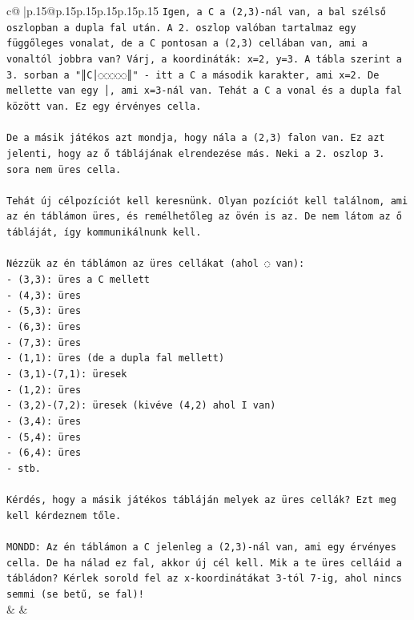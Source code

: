 \documentclass{article}
\begin{document}
{\begin{supertabular}{c@{$\;$}|p{.15\linewidth}@{}p{.15\linewidth}p{.15\linewidth}p{.15\linewidth}p{.15\linewidth}p{.15\linewidth}}
{{{\texttt{Igen, a C a (2,3){-}nál van, a bal szélső oszlopban a dupla fal után. A 2. oszlop valóban tartalmaz egy függőleges vonalat, de a C pontosan a (2,3) cellában van, ami a vonaltól jobbra van? Várj, a koordináták: x=2, y=3. A tábla szerint a 3. sorban a "║C│◌◌◌◌◌║" {-} itt a C a második karakter, ami x=2. De mellette van egy │, ami x=3{-}nál van. Tehát a C a vonal és a dupla fal között van. Ez egy érvényes cella.} \\
\\ 
\texttt{De a másik játékos azt mondja, hogy nála a (2,3) falon van. Ez azt jelenti, hogy az ő táblájának elrendezése más. Neki a 2. oszlop 3. sora nem üres cella. } \\
\\ 
\texttt{Tehát új célpozíciót kell keresnünk. Olyan pozíciót kell találnom, ami az én táblámon üres, és remélhetőleg az övén is az. De nem látom az ő tábláját, így kommunikálnunk kell.} \\
\\ 
\texttt{Nézzük az én táblámon az üres cellákat (ahol ◌ van):} \\
\texttt{{-} (3,3): üres a C mellett} \\
\texttt{{-} (4,3): üres} \\
\texttt{{-} (5,3): üres} \\
\texttt{{-} (6,3): üres} \\
\texttt{{-} (7,3): üres} \\
\texttt{{-} (1,1): üres (de a dupla fal mellett)} \\
\texttt{{-} (3,1){-}(7,1): üresek} \\
\texttt{{-} (1,2): üres} \\
\texttt{{-} (3,2){-}(7,2): üresek (kivéve (4,2) ahol I van)} \\
\texttt{{-} (3,4): üres} \\
\texttt{{-} (5,4): üres} \\
\texttt{{-} (6,4): üres} \\
\texttt{{-} stb.} \\
\\ 
\texttt{Kérdés, hogy a másik játékos tábláján melyek az üres cellák? Ezt meg kell kérdeznem tőle.} \\
\\ 
\texttt{MONDD: Az én táblámon a C jelenleg a (2,3){-}nál van, ami egy érvényes cella. De ha nálad ez fal, akkor új cél kell. Mik a te üres celláid a tábládon? Kérlek sorold fel az x{-}koordinátákat 3{-}tól 7{-}ig, ahol nincs semmi (se betű, se fal)!} \\
            }
        }
    }
    & & \\ \\


\end{supertabular}}
\end{document}
